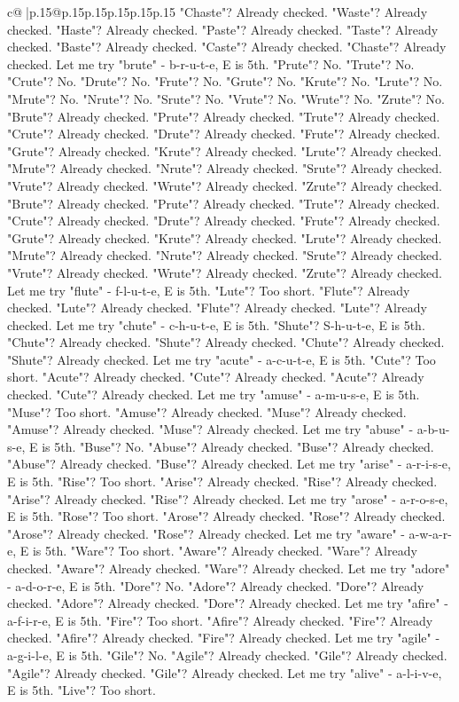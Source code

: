 \documentclass{article}
\begin{document}
{\begin{supertabular}{c@{$\;$}|p{.15\linewidth}@{}p{.15\linewidth}p{.15\linewidth}p{.15\linewidth}p{.15\linewidth}p{.15\linewidth}}
{{{"Chaste"? Already checked. "Waste"? Already checked. "Haste"? Already checked. "Paste"? Already checked. "Taste"? Already checked. "Baste"? Already checked. "Caste"? Already checked. "Chaste"? Already checked. Let me try "brute" {-} b{-}r{-}u{-}t{-}e, E is 5th. "Prute"? No. "Trute"? No. "Crute"? No. "Drute"? No. "Frute"? No. "Grute"? No. "Krute"? No. "Lrute"? No. "Mrute"? No. "Nrute"? No. "Srute"? No. "Vrute"? No. "Wrute"? No. "Zrute"? No. "Brute"? Already checked. "Prute"? Already checked. "Trute"? Already checked. "Crute"? Already checked. "Drute"? Already checked. "Frute"? Already checked. "Grute"? Already checked. "Krute"? Already checked. "Lrute"? Already checked. "Mrute"? Already checked. "Nrute"? Already checked. "Srute"? Already checked. "Vrute"? Already checked. "Wrute"? Already checked. "Zrute"? Already checked. "Brute"? Already checked. "Prute"? Already checked. "Trute"? Already checked. "Crute"? Already checked. "Drute"? Already checked. "Frute"? Already checked. "Grute"? Already checked. "Krute"? Already checked. "Lrute"? Already checked. "Mrute"? Already checked. "Nrute"? Already checked. "Srute"? Already checked. "Vrute"? Already checked. "Wrute"? Already checked. "Zrute"? Already checked. Let me try "flute" {-} f{-}l{-}u{-}t{-}e, E is 5th. "Lute"? Too short. "Flute"? Already checked. "Lute"? Already checked. "Flute"? Already checked. "Lute"? Already checked. Let me try "chute" {-} c{-}h{-}u{-}t{-}e, E is 5th. "Shute"? S{-}h{-}u{-}t{-}e, E is 5th. "Chute"? Already checked. "Shute"? Already checked. "Chute"? Already checked. "Shute"? Already checked. Let me try "acute" {-} a{-}c{-}u{-}t{-}e, E is 5th. "Cute"? Too short. "Acute"? Already checked. "Cute"? Already checked. "Acute"? Already checked. "Cute"? Already checked. Let me try "amuse" {-} a{-}m{-}u{-}s{-}e, E is 5th. "Muse"? Too short. "Amuse"? Already checked. "Muse"? Already checked. "Amuse"? Already checked. "Muse"? Already checked. Let me try "abuse" {-} a{-}b{-}u{-}s{-}e, E is 5th. "Buse"? No. "Abuse"? Already checked. "Buse"? Already checked. "Abuse"? Already checked. "Buse"? Already checked. Let me try "arise" {-} a{-}r{-}i{-}s{-}e, E is 5th. "Rise"? Too short. "Arise"? Already checked. "Rise"? Already checked. "Arise"? Already checked. "Rise"? Already checked. Let me try "arose" {-} a{-}r{-}o{-}s{-}e, E is 5th. "Rose"? Too short. "Arose"? Already checked. "Rose"? Already checked. "Arose"? Already checked. "Rose"? Already checked. Let me try "aware" {-} a{-}w{-}a{-}r{-}e, E is 5th. "Ware"? Too short. "Aware"? Already checked. "Ware"? Already checked. "Aware"? Already checked. "Ware"? Already checked. Let me try "adore" {-} a{-}d{-}o{-}r{-}e, E is 5th. "Dore"? No. "Adore"? Already checked. "Dore"? Already checked. "Adore"? Already checked. "Dore"? Already checked. Let me try "afire" {-} a{-}f{-}i{-}r{-}e, E is 5th. "Fire"? Too short. "Afire"? Already checked. "Fire"? Already checked. "Afire"? Already checked. "Fire"? Already checked. Let me try "agile" {-} a{-}g{-}i{-}l{-}e, E is 5th. "Gile"? No. "Agile"? Already checked. "Gile"? Already checked. "Agile"? Already checked. "Gile"? Already checked. Let me try "alive" {-} a{-}l{-}i{-}v{-}e, E is 5th. "Live"? Too short. }}}
\end{supertabular}}
\end{document}
